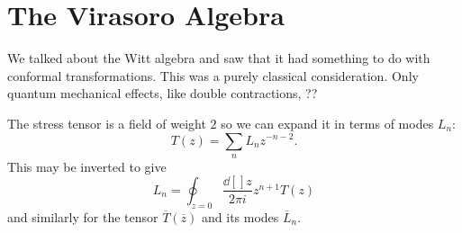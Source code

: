 \section{The Virasoro Algebra}%
\label{sec:the_virasoro_algebra}

We talked about the Witt algebra and saw that it had something to do with conformal transformations.
This was a purely classical consideration. Only quantum mechanical effects, like double contractions, ??

The stress tensor is a field of weight $2$ so we can expand it in terms of modes $L_n$:
\begin{equation}
  T(z) = \sum_n L_n z^{-n-2}.
\end{equation}
This may be inverted to give 
\begin{equation}
  L_n = \oint_{z = 0} \frac{\dd[]{z}}{2 \pi i } z^{n+1} T(z)
\end{equation}
and similarly for the tensor $\overline{T}{}(\overline{z}{})$ and its modes $\overline{L}{}_n$.

